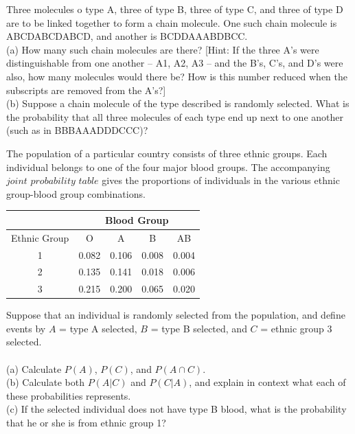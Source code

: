 \documentclass[12pt,letterpaper]{hmcpset}
\begin{document}
\begin{solution}

\end{solution}
\newpage
\begin{problem}[2.3.40]
Three molecules o type A, three of type B, three of type C, and three of type D are to be linked together to form a chain molecule. One such chain molecule is ABCDABCDABCD, and another is BCDDAAABDBCC.
\\
(a) How many such chain molecules are there? [Hint: If the three A’s were distinguishable from one another – A1, A2, A3 – and the B’s, C’s, and D’s were also, how many molecules would there be? How is this number reduced when the subscripts are removed from the A’s?]
\\
(b) Suppose a chain molecule of the type described is randomly selected. What is the probability that all three molecules of each type end up next to one another (such as in BBBAAADDDCCC)?

\end{problem}

\begin{solution}

\end{solution}
\newpage

\begin{problem}[2.4.45]
The population of a particular country consists of three ethnic groups. Each individual belongs to one of the four major blood groups. The accompanying $\textit{joint probability table}$ gives the proportions of individuals in the various ethnic group-blood group combinations.\\
\begin{center}
	\begin{tabular}{|c||c|c|c|c|}
		\hline
		  & \multicolumn{4}{c|}{Blood Group}\\
 		\hline
 		\hline
 		Ethnic Group & O & A & B & AB \\
 		\hline
 		1 & 0.082 & 0.106 & 0.008 & 0.004 \\
 		2 & 0.135 & 0.141 & 0.018 & 0.006\\
 		3 & 0.215 & 0.200 & 0.065 & 0.020\\
 		 \hline
	 \end{tabular}

\end{center}
Suppose that an individual is randomly selected from the population, and define events by $A$ = {type A selected}, $B$ = {type B selected}, and $C$ = {ethnic group 3 selected}.
\\ \\
(a) Calculate $P(A)$, $P(C)$, and $P(A\cap C)$.
\\
	(b) Calculate both $P(A|C)$ and $P(C|A)$, and explain in context what each of these probabilities represents.
\\
(c) If the selected individual does not have type B blood, what is the probability that he or she is from ethnic group 1?

\end{problem}
\end{document}
